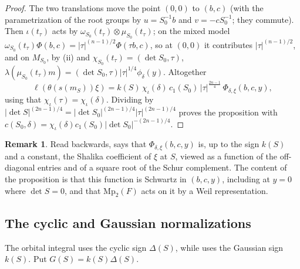 \documentclass[11pt,oneside,notitlepage]{book}
\numberwithin{equation}{section}
\theoremstyle{plain}
\theoremstyle{definition}
\newtheorem{remark}[theorem]{Remark}
\newcommand{\Mp}{\mathrm{Mp}}
\newcommand{\hil}[2]{(#1,#2)}
\begin{document}
\begin{proof}
	The two translations move the point $(0,0)$ to $(b,c)$ (with the parametrization of the root groups by $u=S_0^{-1}b$ and $v=-cS_0^{-1}$; they commute). Then $\iota(t_\tau )$ acts by $\omega_{S_0}(t_\tau )\otimes\mu_{S_0}(t_\tau )$; on the mixed model $\omega_{S_0}(t_\tau )\Phi(b,c)=|\tau |^{(n-1)/2}\Phi(\tau b,c)$, so at $(0,0)$ it contributes $|\tau |^{(n-1)/2}$, and on $M_{S_0}$, by (ii) and $\chi_{S_0}(t_\tau )=\hil{\det S_0}{\tau }$, $\lambda(\mu_{S_0}(t_\tau )m)=\hil{\det S_0}\tau |\tau |^{1/4}\phi_\delta(y)$. Altogether
	\[\ell(\theta(s(m_S))\xi)=k(S)\,\chi_\iota(\delta)\,c_1(S_0)\,|\tau |^{\frac{2n-1}4}\,\Phi_{\delta,\xi}(b,c,y),\]
	using that $\chi_\iota(\tau )=\chi_\iota(\delta)$. Dividing by $|\det S|^{(2n-1)/4}=|\det S_0|^{(2n-1)/4}|\tau |^{(2n-1)/4}$ proves the proposition with $c(S_0,\delta)=\chi_\iota(\delta)c_1(S_0)|\det S_0|^{-(2n-1)/4}$.
\end{proof}

\begin{remark}
	Read backwards,  says that $\Phi_{\delta,\xi}(b,c,y)$ is, up to the sign $k(S)$ and a constant, the Shalika coefficient of $\xi$ at $S$, viewed as a function of the off-diagonal entries and of a square root of the Schur complement. The content of the proposition is that this function is Schwartz in $(b,c,y)$, including at $y=0$ where $\det S=0$, and that $\Mp_2(F)$ acts on it by a Weil representation.
\end{remark}

\subsection*{The cyclic and Gaussian normalizations}
The orbital integral uses the cyclic sign $\Delta(S)$, while  uses the Gaussian sign $k(S)$. Put $G(S)=k(S)\Delta(S)$.
\end{document}
